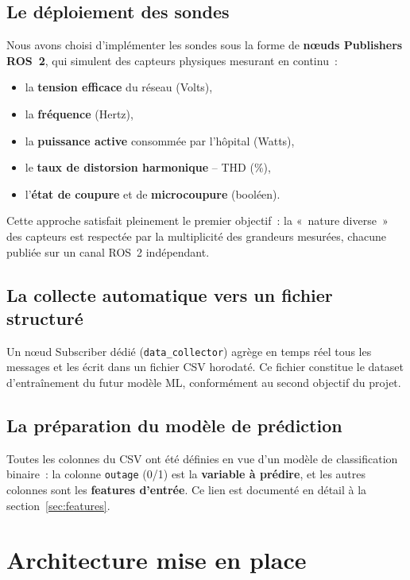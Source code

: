 \documentclass[12pt,a4paper]{article}
\begin{document}
\subsection{Le déploiement des sondes}

Nous avons choisi d'implémenter les sondes sous la forme de
\textbf{nœuds Publishers ROS~2}, qui simulent des capteurs physiques
mesurant en continu~:

\begin{itemize}
  \item la \textbf{tension efficace} du réseau (Volts),
  \item la \textbf{fréquence} (Hertz),
  \item la \textbf{puissance active} consommée par l'hôpital (Watts),
  \item le \textbf{taux de distorsion harmonique} -- THD (\%),
  \item l'\textbf{état de coupure} et de \textbf{microcoupure} (booléen).
\end{itemize}

Cette approche satisfait pleinement le premier objectif~: la «~nature
diverse~» des capteurs est respectée par la multiplicité des grandeurs
mesurées, chacune publiée sur un canal ROS~2 indépendant.

\subsection{La collecte automatique vers un fichier structuré}

Un nœud Subscriber dédié (\texttt{data\_collector}) agrège en temps réel
tous les messages et les écrit dans un fichier CSV horodaté.
Ce fichier constitue le dataset d'entraînement du futur modèle ML,
conformément au second objectif du projet.

\subsection{La préparation du modèle de prédiction}

Toutes les colonnes du CSV ont été définies en vue d'un modèle de
classification binaire~: la colonne \texttt{outage} (0/1) est la
\textbf{variable à prédire}, et les autres colonnes sont les
\textbf{features d'entrée}. Ce lien est documenté en détail
à la section~\ref{sec:features}.

\section{Architecture mise en place}
\label{sec:architecture}
\end{document}
